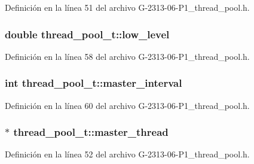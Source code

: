 Definición en la línea 51 del archivo G-\/2313-\/06-\/\+P1\+\_\+thread\+\_\+pool.\+h.

\subsubsection[{\texorpdfstring{low\+\_\+level}{low_level}}]{\setlength{\rightskip}{0pt plus 5cm}double thread\+\_\+pool\+\_\+t\+::low\+\_\+level}\hypertarget{structthread__pool__t_a815792ab9c936b06d46ef3e149e5fd88}{}\label{structthread__pool__t_a815792ab9c936b06d46ef3e149e5fd88}


Definición en la línea 58 del archivo G-\/2313-\/06-\/\+P1\+\_\+thread\+\_\+pool.\+h.

\subsubsection[{\texorpdfstring{master\+\_\+interval}{master_interval}}]{\setlength{\rightskip}{0pt plus 5cm}int thread\+\_\+pool\+\_\+t\+::master\+\_\+interval}\hypertarget{structthread__pool__t_ae3eaf8d90ef550166e595286a6175d14}{}\label{structthread__pool__t_ae3eaf8d90ef550166e595286a6175d14}


Definición en la línea 60 del archivo G-\/2313-\/06-\/\+P1\+\_\+thread\+\_\+pool.\+h.

\subsubsection[{\texorpdfstring{master\+\_\+thread}{master_thread}}]{$\ast$ thread\+\_\+pool\+\_\+t\+::master\+\_\+thread}\hypertarget{structthread__pool__t_a9ad8218717dde39eef701a8bce5ca0a1}{}\label{structthread__pool__t_a9ad8218717dde39eef701a8bce5ca0a1}


Definición en la línea 52 del archivo G-\/2313-\/06-\/\+P1\+\_\+thread\+\_\+pool.\+h.

